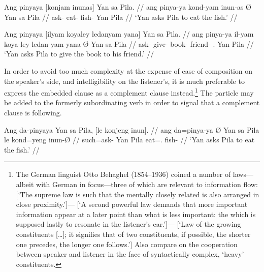 \pex[*=\ques\ques]
\a\ljudge{\ques}\begingl
	\gla Ang pinyaya {\normalfont [}konjam inunas{\normalfont]} {} Yan sa 
		Pila. //
	\glb ang pinya-ya kond-yam inun-as Ø Yan sa Pila //
	\glc \AgtT{} ask-\TsgM{} eat-\Ptcp{} fish-\Parg{} \Top{} Yan \Parg{} 
		Pila //
	\glft `Yan asks Pila to eat the fish.' //
\endgl

\a\ljudge{\ques\ques}\begingl
	\gla Ang pinyaya {\normalfont [}ilyam koyaley ledanyam 
		yana{\normalfont]} {} Yan sa Pila. //
	\glb ang pinya-ya il-yam koya-ley ledan-yam yana Ø Yan sa Pila //
	\glc \AgtT{} ask-\TsgM{} give-\Ptcp{} book-\PargI{} friend-\Dat{} 
		\TsgM{}.\Gen{} \Top{} Yan \Parg{} Pila //
	\glft `Yan asks Pila to give the book to his friend.' //
\endgl
\xe

In order to avoid too much complexity at the expense of ease of composition on
the speaker's side, and intelligibility on the listener's, it is much
preferable to express the embedded clause as a complement clause
instead.\footnote{The German linguist Otto Behaghel (1854--1936) coined a
number of laws---albeit with German in focus---three of which are relevant to
information flow:  [`The
supreme law is such that the mentally closely related is also arranged in close
proximity.']--- [`A second powerful law demands that more
important information appear at a later point than what is less important: the
which is supposed lastly to resonate in the listener's
ear.']--- [`Law of the growing constituents […]; it signifies that of
two constituents, if possible, the shorter one precedes, the longer one
follows.'] Also compare \citet{wasow1997} on the cooperation between speaker
and listener in the face of syntactically complex, `heavy' constituents.} The
particle  may be added to the formerly subordinating verb in
order to signal that a complement clause is following.

\pex
\a\begingl
	\gla Ang da-pinyaya {} Yan sa Pila, {\normalfont [}le konjeng 
		inun{\normalfont ]}. //
	\glb ang da=pinya-ya Ø Yan sa Pila le kond=yeng inun-Ø //
	\glc \AgtT{} such=ask-\TsgM{} \Top{} Yan \Parg{} Pila \PatTI{} 
		eat=\TsgF{}.\Aarg{} fish-\Top{} //
	\glft `Yan asks Pila to eat the fish.' //
\endgl

